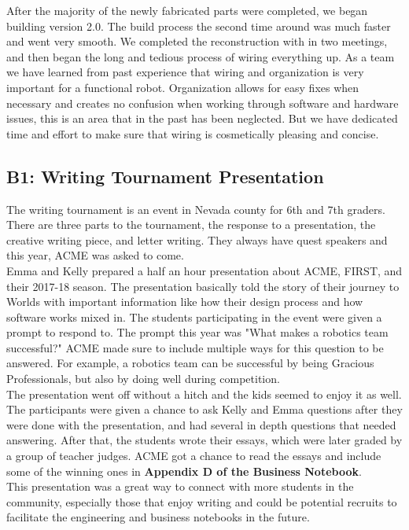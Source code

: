 \documentclass{article}
\begin{document}
After the majority of the newly fabricated parts were completed, we began building version 2.0. The build process the second time around was much faster and went very smooth. We completed the reconstruction with in two meetings, and then began the long and tedious process of wiring everything up. As a team we have learned from past experience that wiring and organization is very important for a functional robot. Organization allows for easy fixes when necessary and creates no confusion when working through software and hardware issues, this is an area that in the past has been neglected. But we have dedicated time and effort to make sure that wiring is cosmetically pleasing and concise. 
\subsection{B1: Writing Tournament Presentation}

The writing tournament is an event in Nevada county for 6th and 7th graders. There are three parts to the tournament, the response to a presentation, the creative writing piece, and letter writing. They always have quest speakers and this year, ACME was asked to come. \\

Emma and Kelly prepared a half an hour presentation about ACME, FIRST, and  their 2017-18 season. The presentation basically told the story of their journey to Worlds with important information like how their design process and how software works mixed in. The students participating in the event were given a prompt to respond to. The prompt this year was "What makes a robotics team successful?" ACME made sure to include multiple ways for this question to be answered. For example, a robotics team can be successful by being Gracious Professionals, but also by doing well during competition. \\

The presentation went off without a hitch and the kids seemed to enjoy it as well. The participants were given a chance to ask Kelly and Emma questions after they were done with the presentation, and had several in depth questions that needed answering. After that, the students wrote their essays, which were later graded by a group of teacher judges. ACME got a chance to read the essays and include some of the winning ones in \textbf{Appendix D of the Business Notebook}. \\

This presentation was a great way to connect with more students in the community, especially those that enjoy writing and could be potential recruits to facilitate the engineering and business notebooks in the future. \\
\end{document}

